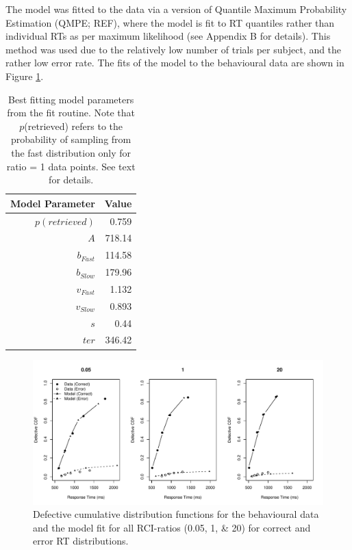 \documentclass[a4paper, jou, natbib]{apa6}
\begin{document}
The model was fitted to the data via a version of Quantile Maximum Probability Estimation (QMPE; REF), where the model is fit to RT quantiles rather than individual RTs as per maximum likelihood (see Appendix B for details). This method was used due to the relatively low number of trials per subject, and the rather low error rate. The fits of the model to the behavioural data are shown in Figure \ref{fig:modelFit}. 

\begin{table}[htbp]
  \centering
  \caption{Best fitting model parameters from the fit routine. Note that $p$(retrieved) refers to the probability of sampling from the fast distribution only for ratio = 1 data points. See text for details.}
    \begin{tabular}{rr}
    \toprule
    Model Parameter & Value \\
    \midrule
    $p(retrieved)$     & 0.759 \\
    $A$     & 718.14 \\
    $b_{Fast}$ & 114.58 \\
    $b_{Slow}$ & 179.96 \\
    $v_{Fast}$ & 1.132 \\
    $v_{Slow}$ & 0.893 \\
    $s$     & 0.44 \\
    $ter$   & 346.42 \\
    \bottomrule
    \end{tabular}%
  \label{tab:bestParameters}%
\end{table}%


\begin{figure}
\begin{center}
\includegraphics[width = \textwidth]{Images/qmp2RCI_drift_+_b.pdf}
\caption{Defective cumulative distribution functions for the behavioural data and the model fit for all RCI-ratios (0.05, 1, \& 20) for correct and error RT distributions.}
\label{fig:modelFit}
\end{center}
\end{figure}
\end{document}
